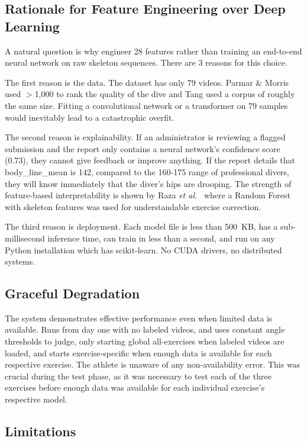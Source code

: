 \documentclass[conference]{IEEEtran}
\begin{document}
\subsection{Rationale for Feature Engineering over Deep Learning}
A natural question is why engineer 28 features rather than training an end-to-end neural network on raw skeleton sequences. There are 3 reasons for this choice.

The first reason is the data. The dataset has only 79 videos. Parmar \& Morris used $>$1,000 to rank the quality of the dive and Tang used a corpus of roughly the same size. Fitting a convolutional network or a transformer on 79 samples would inevitably lead to a catastrophic overfit.

The second reason is explainability. If an administrator is reviewing a flagged submission and the report only contains a neural network's confidence score (0.73), they cannot give feedback or improve anything. If the report details that body\_line\_mean is 142, compared to the 160-175 range of professional divers, they will know immediately that the diver's hips are drooping. The strength of feature-based interpretability is shown by Raza \textit{et al.}~\cite{raza2023} where a Random Forest with skeleton features was used for understandable exercise correction.

The third reason is deployment. Each model file is less than 500~KB, has a sub-millisecond inference time, can train in less than a second, and run on any Python installation which has scikit-learn. No CUDA drivers, no distributed systems.

\subsection{Graceful Degradation}
The system demonstrates effective performance even when limited data is available. Runs from day one with no labeled videos, and uses constant angle thresholds to judge, only starting global all-exercises when labeled videos are loaded, and starts exercise-specific when enough data is available for each respective exercise. The athlete is unaware of any non-availability error. This was crucial during the test phase, as it was necessary to test each of the three exercises before enough data was available for each individual exercise's respective model.

\subsection{Limitations}
\end{document}
